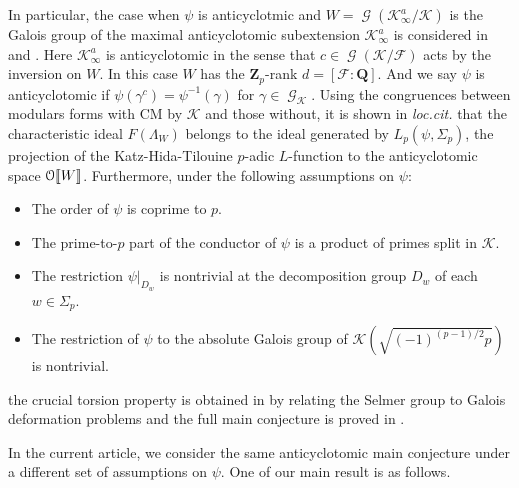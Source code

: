 \documentclass[leqno]{amsart}
\theoremstyle{definition}
\theoremstyle{remark}
\newcommand{\eo}{\EuScript{O}}
\newcommand{\Q}{{\mathbf{Q}}}
\newcommand{\Zp}{\mathbf{Z}_p}
\DeclareMathOperator{\Gal}{\mathcal{G}}
\newcommand{\F}{{\mathcal{F}}} %
\newcommand{\K}{{\mathcal{K}}} %
\begin{document}
In particular, the case when 
$\psi$ is anticyclotmic and
$W=\Gal(\K_\infty^a/\K)$ is the Galois group of the maximal 
anticyclotomic subextension $\K_\infty^a$ is considered
in \cite{HT93} and \cite{HT94}.
Here $\K_\infty^a$ is anticyclotomic in the sense that 
$c\in\Gal(\K/\F)$ acts by the inversion on $W$.
In this case $W$ has the $\Zp$-rank $d=[\F:\Q]$.
And we say $\psi$ is anticyclotomic if 
$\psi(\gamma^c)=\psi^{-1}(\gamma)$ for $\gamma\in\Gal_\K$.
Using the congruences between modulars forms
with CM by $\K$ and those without,
it is shown in \textit{loc.cit.}
that the characteristic ideal $F(\Lambda_W)$
belongs to the ideal generated by $L_p(\psi,\Sigma_p)$,
the projection of the Katz-Hida-Tilouine $p$-adic $L$-function
to the anticyclotomic space $\eo\llbracket W\rrbracket$.
Furthermore, under the following  assumptions on $\psi$:
\begin{itemize}
    \item The order of $\psi$ is coprime to $p$.
    \item The prime-to-$p$ part of the conductor of $\psi$
    is a product of primes split in $\K$.
    \item The restriction $\psi\vert_{D_w}$ is nontrivial
    at the decomposition group $D_w$ of each $w\in\Sigma_p$.
    \item The restriction of $\psi$ to 
    the absolute Galois group of $\K(\sqrt{(-1)^{(p-1)/2}p})$
    is nontrivial.
\end{itemize}
the crucial torsion property is obtained in
\cite[Thm.5.33]{Hida06b} by relating the Selmer group to 
Galois deformation problems
and the full main conjecture 
is proved in \cite{Hida06}.

In the current article, we consider the same
anticyclotomic main conjecture under
a different set of assumptions on $\psi$.
One of our main result is as follows.
\end{document}
